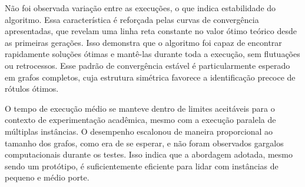Não foi observada variação entre as execuções, o que indica estabilidade do algoritmo. Essa característica é reforçada pelas curvas de convergência apresentadas, que revelam uma linha reta constante no valor ótimo teórico desde as primeiras gerações. Isso demonstra que o algoritmo foi capaz de encontrar rapidamente soluções ótimas e mantê-las durante toda a execução, sem flutuações ou retrocessos. Esse padrão de convergência estável é particularmente esperado em grafos completos, cuja estrutura simétrica favorece a identificação precoce de rótulos ótimos.

O tempo de execução médio se manteve dentro de limites aceitáveis para o contexto de experimentação acadêmica, mesmo com a execução paralela de múltiplas instâncias. O desempenho escalonou de maneira proporcional ao tamanho dos grafos, como era de se esperar, e não foram observados gargalos computacionais durante os testes. Isso indica que a abordagem adotada, mesmo sendo um protótipo, é suficientemente eficiente para lidar com instâncias de pequeno e médio porte.

\begin{quadro}[htbp]
    \centering
    \caption{Resultados para grafos completos \(K_n\)}
    \label{tab:resumo-kn}
    \caption*{Fonte: Elaborado pelo autor.}
\end{quadro}


